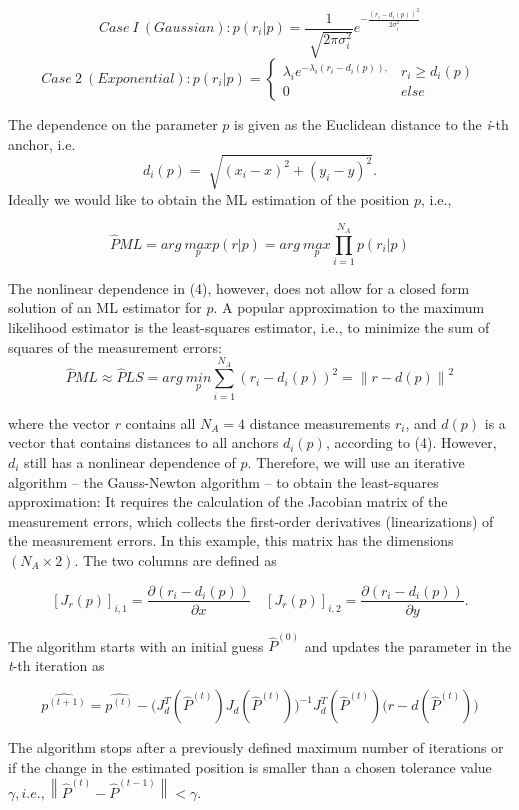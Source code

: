\documentclass[a4paper]{article}
\newcommand\norm[1]{\left\lVert#1\right\rVert}
\begin{document}
\[
Case ~I ~(Gaussian): p(r_i|p) = \frac{1}{\sqrt[]{2\pi\sigma^2_i}}e^{-\frac{(r_i-d_i(p))^2}{2\sigma^2_i}}
\]
\[
Case ~2 ~(Exponential): p(r_i|p) = \begin{cases} \lambda_i e^{-\lambda_i(r_i-d_i(p)),} & r_i\geq d_i(p)\\ 0 & else  \end{cases}
\]

The dependence on the parameter $p$ is given as the Euclidean distance to the \textit{i}-th anchor, i.e.
\[
d_i(p) = \sqrt[]{(x_i-x)^2 + (y_i-y)^2}.
\]
Ideally we would like to obtain the ML estimation of the position $p$, i.e.,

\[
\hat{P}ML = arg ~\underset{p}{max} p(r|p) = arg ~\underset{p}{max} \prod_{i=1}^{N_A} p(r_i|p)
\]

The nonlinear dependence in (4), however, does not allow for a closed form solution of an ML estimator for $p$. A popular approximation to the maximum likelihood estimator is the least-squares estimator, i.e., to minimize the sum of squares of the measurement errors:
\[
\hat{P}ML \approx \hat{P}LS = arg ~\underset{p}{min} \sum_{i=1}^{N_A} (r_i-d_i(p))^2 = \norm{r-d(p)}^2 
\]

where the vector $r$ contains all $N_A = 4$ distance measurements $r_i$, and $d(p)$ is a vector that contains distances to all anchors $d_i(p)$, according to (4).
However, $d_i$ still has a nonlinear dependence of $p$. Therefore, we will use an iterative algorithm – the Gauss-Newton algorithm – to obtain the least-squares approximation: It requires the calculation of the Jacobian matrix of the measurement errors, which collects the first-order derivatives (linearizations) of the measurement errors. In this example, this matrix has the dimensions $(N_A × 2)$. The two columns are defined as

\[
[J_r(p)]_{i,1} = \frac{\partial(r_i-d_i(p))}{\partial x} \quad [J_r(p)]_{i,2} = \frac{\partial(r_i-d_i(p))}{\partial y}.
\]

The algorithm starts with an initial guess $\hat{P}^(0)$ and updates the parameter in the \textit{t}-th iteration as

\[
\hat{p^{(t+1)}} = \hat{p^{(t)}} - \Big ( J^T_d(\hat{P}^{(t)})J_d(\hat{P}^{(t)})\Big) ^{-1} J^T_d(\hat{P}^{(t)}) \Big (r-d(\hat{P}^{(t)}) \Big)
\]

The algorithm stops after a previously defined maximum number of iterations or if the change in the estimated position is smaller than a chosen tolerance value $ \gamma, i.e., \norm{\hat{P}^{(t)} - \hat{P}^{(t-1)}} < \gamma$.
\end{document}
